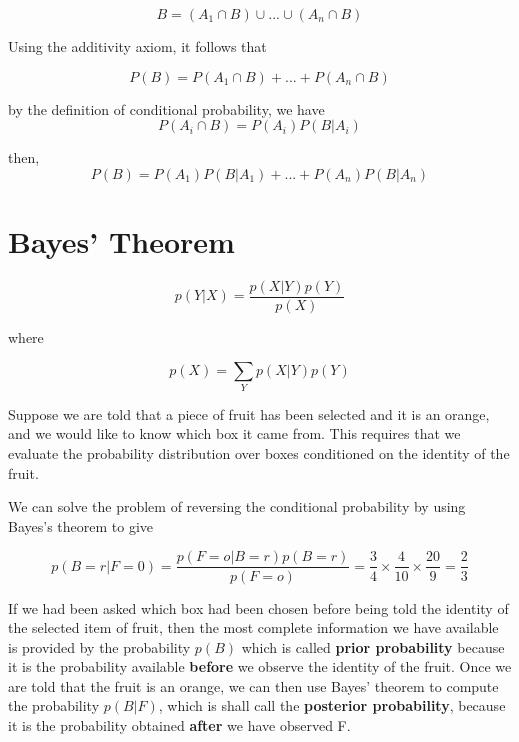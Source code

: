 \begin{equation}
    B = (A_1 \cap B) \cup ... \cup (A_n \cap B)
\end{equation}

Using the additivity axiom, it follows that

\begin{equation}
    P(B) = P(A_1 \cap B) + ... + P(A_n \cap B)
\end{equation}

by the definition of conditional probability, we have
\begin{equation}
    P(A_i \cap B) = P(A_i)P(B | A_i)
\end{equation}

then,
\begin{equation}
   P(B) = P(A_1)P(B | A_1) + ... + P(A_n)P(B | A_n)
\end{equation}


\section{Bayes' Theorem}

\begin{equation}
    p(Y|X) = \frac{p(X|Y)p(Y)}{p(X)}
\end{equation}

where

\begin{equation}
    p(X) = \sum_{Y} p(X|Y)p(Y)
\end{equation}

Suppose we are told that a piece of fruit has been selected and it is an orange, and we would like to know which box it came from. This requires that we evaluate the probability distribution over boxes conditioned on the identity of the fruit.

We can solve the problem of reversing the conditional probability by using Bayes's theorem to give

\begin{equation}
    p(B = r | F = 0) = \frac{p(F = o | B = r)p(B = r)}{p(F = o)} = \frac{3}{4} \times \frac{4}{10} \times \frac{20}{9} = \frac{2}{3}
\end{equation}

If we had been asked which box had been chosen before being told the identity of the selected item of fruit, then the most complete information we have available is provided by the probability $p(B)$ which is called \textbf{prior probability} because it is the probability available \textbf{before} we observe the identity of the fruit. Once we are told that the fruit is an orange, we can then use Bayes' theorem to compute the probability $p(B | F)$, which is shall call the \textbf{posterior probability}, because it is the probability obtained  \textbf{after} we have observed F.


